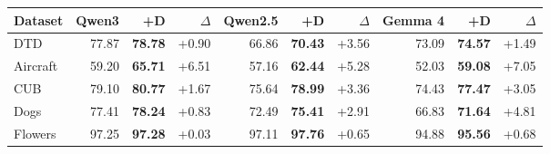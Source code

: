 \begin{tabular}{lrrrrrrrrr}
\toprule
Dataset & Qwen3 & +D & $\Delta$ & Qwen2.5 & +D & $\Delta$ & Gemma 4 & +D & $\Delta$ \\
\midrule
DTD & 77.87 & \textbf{78.78} & +0.90 & 66.86 & \textbf{70.43} & +3.56 & 73.09 & \textbf{74.57} & +1.49 \\
Aircraft & 59.20 & \textbf{65.71} & +6.51 & 57.16 & \textbf{62.44} & +5.28 & 52.03 & \textbf{59.08} & +7.05 \\
CUB & 79.10 & \textbf{80.77} & +1.67 & 75.64 & \textbf{78.99} & +3.36 & 74.43 & \textbf{77.47} & +3.05 \\
Dogs & 77.41 & \textbf{78.24} & +0.83 & 72.49 & \textbf{75.41} & +2.91 & 66.83 & \textbf{71.64} & +4.81 \\
Flowers & 97.25 & \textbf{97.28} & +0.03 & 97.11 & \textbf{97.76} & +0.65 & 94.88 & \textbf{95.56} & +0.68 \\
\bottomrule
\end{tabular}
